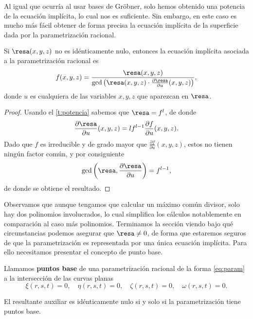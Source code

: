 Al igual que ocurría al usar bases de Gröbner, solo hemos obtenido una potencia de la ecuación implícita, lo cual nos es suficiente. Sin embargo, en este caso es mucho más fácil obtener de forma precisa la ecuación implícita de la superficie dada por la parametrización racional.
\begin{teorema}\label{t:resDef}
    Si $\resa(x,y,z)$ no es idénticamente nulo, entonces la ecuación implícita asociada a la parametrización racional es
    \begin{equation*}
        f(x,y,z) = \frac{\resa(x,y,z)}{\gcd\left( \resa(x,y,z)\cdot \frac{\partial \resa}{\partial u}(x,y,z)  \right)},
    \end{equation*}
    donde $u$ es cualquiera de las variables $x,y,z$ que aparezcan en $\resa$.  
\end{teorema}
\begin{proof}
    Usando el \autoref{t:potencia} sabemos que $\resa = f^l$, de donde
    \begin{equation*}
         \frac{\partial \resa}{\partial u}(x,y,z) = lf^{l-1} \frac{\partial f}{\partial u}(x,y,z).
    \end{equation*}
    Dado que $f$ es irreducible y de grado mayor que $ \frac{\partial f}{\partial u}(x,y,z)$, estos no tienen ningún factor común, y por consiguiente
    \begin{equation*}
        \gcd\left( \resa, \frac{\partial \resa}{\partial u}\right) = f^{l-1},
    \end{equation*}
    de donde se obtiene el resultado.
\end{proof}

Observamos que aunque tengamos que calcular un máximo común divisor, solo hay dos polinomios involucrados, lo cual simplifica los cálculos notablemente en comparación al caso más polinomios. Terminamos la sección viendo bajo qué circunstancias podemos asegurar que $\resa \neq 0$, de forma que estaremos seguros de que la parametrización es representada por una única ecuación implícita. Para ello necesitamos presentar el concepto de punto base.
\begin{definicion}
    Llamamos \textbf{puntos base} de una parametrización racional de la forma \eqref{eq:param} a la intersección de las curvas planas
    \begin{equation*}
       \xi(r,s,t) = 0,\quad \eta(r,s,t) = 0,\quad \zeta(r,s,t)=0,\quad \omega(r,s,t)=0.
    \end{equation*}
\end{definicion}
\begin{teorema}
    El resultante auxiliar es idénticamente nulo si y solo si la parametrización tiene puntos base.
\end{teorema}

